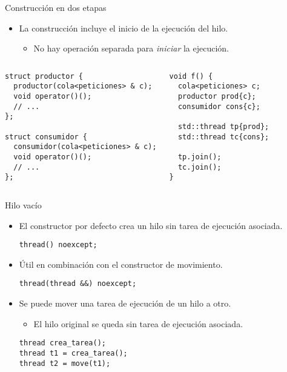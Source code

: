 \begin{frame}[t,fragile]{Construcción en dos etapas}
\begin{itemize}
  \item La construcción incluye el inicio de la ejecución del hilo.
    \begin{itemize}
      \item No hay operación separada para \emph{iniciar} la ejecución.
    \end{itemize}
\end{itemize}

\begin{columns}[T]

\begin{lstlisting}
struct productor {
  productor(cola<peticiones> & c);
  void operator()();
  // ...
};

struct consumidor {
  consumidor(cola<peticiones> & c);
  void operator()();
  // ...
};
\end{lstlisting}

\begin{lstlisting}
void f() {
  cola<peticiones> c;
  productor prod{c};
  consumidor cons{c};

  std::thread tp{prod};
  std::thread tc{cons};

  tp.join();
  tc.join();
}
\end{lstlisting}

\end{columns}
\end{frame}

\begin{frame}[t,fragile]{Hilo vacío}
\begin{itemize}
  \item El constructor por defecto crea un hilo sin tarea de ejecución asociada.
\begin{lstlisting}
thread() noexcept;
\end{lstlisting}
  \item Útil en combinación con el constructor de movimiento.
\begin{lstlisting}
thread(thread &&) noexcept;
\end{lstlisting}
  \item Se puede mover una tarea de ejecución de un hilo a otro.
    \begin{itemize}
      \item El hilo original se queda sin tarea de ejecución asociada.
    \end{itemize}
\begin{lstlisting}
thread crea_tarea();
thread t1 = crea_tarea();
thread t2 = move(t1);
\end{lstlisting}
\end{itemize}
\end{frame}

